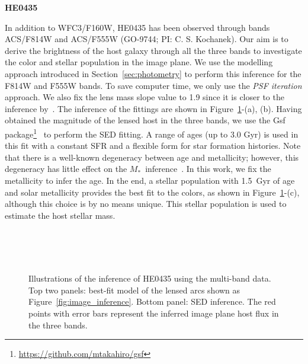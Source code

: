 \documentclass[fleqn,usenatbib]{mnras}
\newcommand{\hst}{{\it HST}}
\newcommand{\mstar}{{$M_*$}}
\begin{document}
{\bf HE0435} ~ {\color{blue}
In addition to WFC3/F160W, HE0435 has been observed through bands ACS/F814W and ACS/F555W (GO-9744; PI: C. S. Kochanek). Our aim is to derive the brightness of the host galaxy through all the three bands to investigate the color and stellar population in the image plane. We use the modelling approach introduced in Section~\ref{sec:photometry} to perform this inference for the F814W and F555W bands. To save computer time, we only use the {\it PSF iteration} approach. We also fix the lens mass slope value to 1.9 since it is closer to the inference by~\citet[][i.e., $\gamma\sim1.93$]{Wong2017}. The inference of the fittings are shown in Figure~\ref{fig:app_HE0435}-(a), (b). Having obtained the magnitude of the lensed host in the three bands, we use the {\sc Gsf} package\footnote{\url{https://github.com/mtakahiro/gsf}}~\citep{Morishita2019} to perform the SED fitting. A range of ages (up to 3.0 Gyr) is used in this fit with a constant SFR and a flexible form for star formation histories. Note that there is a well-known degeneracy between age and metallicity; however, this degeneracy has little effect on the \mstar\ inference~\citep{Bell2001}. In this work, we fix the metallicity to infer the age. In the end, a stellar population with 1.5~Gyr of age and solar metallicity provides the best fit to the colors, as shown in Figure~\ref{fig:app_HE0435}-(c), although this choice is by no means unique. This stellar population is used to estimate the host stellar mass. 

\begin{figure}
\centering
{}\\
\\
\\
\caption{\label{fig:app_HE0435} 
Illustrations of the inference of HE0435 using the multi-band data. Top two panels: best-fit model of the lensed arcs shown as Figure~\ref{fig:image_inference}. Bottom panel: SED inference. The red points with error bars represent the inferred image plane host flux in the three bands.}
\end{figure} 
}
\end{document}
